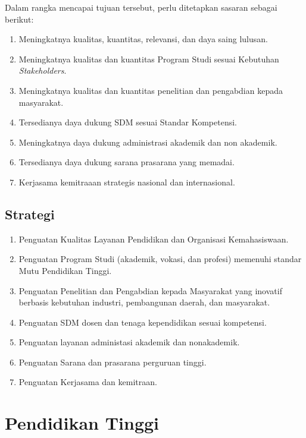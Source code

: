 \documentclass[
]{book}
\providecommand{\tightlist}{%
  \setlength{\itemsep}{0pt}\setlength{\parskip}{0pt}}
\begin{document}
Dalam rangka mencapai tujuan tersebut, perlu ditetapkan sasaran sebagai berikut:

\begin{enumerate}
\def\labelenumi{\arabic{enumi}.}
\tightlist
\item
  Meningkatnya kualitas, kuantitas, relevansi, dan daya saing lulusan.
\item
  Meningkatnya kualitas dan kuantitas Program Studi sesuai Kebutuhan \emph{Stakeholders}.
\item
  Meningkatnya kualitas dan kuantitas penelitian dan pengabdian kepada masyarakat.
\item
  Tersedianya daya dukung SDM sesuai Standar Kompetensi.
\item
  Meningkatnya daya dukung administrasi akademik dan non akademik.
\item
  Tersedianya daya dukung sarana prasarana yang memadai.
\item
  Kerjasama kemitraaan strategis nasional dan internasional.
\end{enumerate}

\hypertarget{strategi}{%
\subsection{Strategi}\label{strategi}}

\begin{enumerate}
\def\labelenumi{\arabic{enumi}.}
\tightlist
\item
  Penguatan Kualitas Layanan Pendidikan dan Organisasi Kemahasiswaan.
\item
  Penguatan Program Studi (akademik, vokasi, dan profesi) memenuhi standar Mutu Pendidikan Tinggi.
\item
  Penguatan Penelitian dan Pengabdian kepada Masyarakat yang inovatif berbasis kebutuhan industri, pembangunan daerah, dan masyarakat.
\item
  Penguatan SDM dosen dan tenaga kependidikan sesuai kompetensi.
\item
  Penguatan layanan administasi akademik dan nonakademik.
\item
  Penguatan Sarana dan prasarana perguruan tinggi.
\item
  Penguatan Kerjasama dan kemitraan.
\end{enumerate}

\hypertarget{pendidikan-tinggi}{%
\section{Pendidikan Tinggi}\label{pendidikan-tinggi}}
\end{document}
